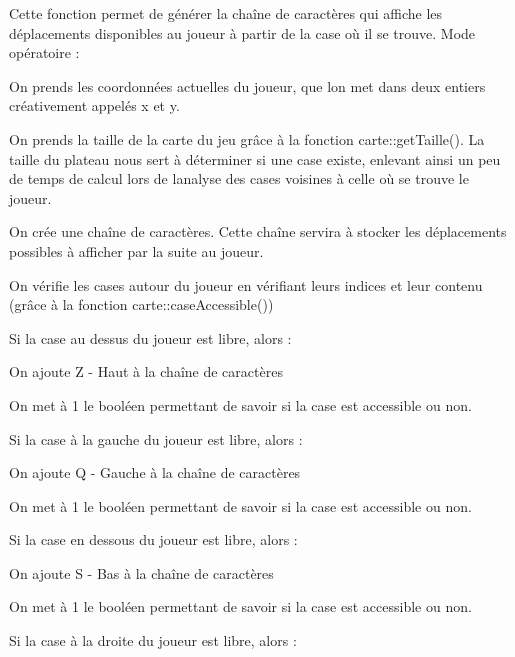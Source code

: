 Cette fonction permet de générer la chaîne de caractères qui affiche les déplacements disponibles au joueur à partir de la case où il se trouve. Mode opératoire \+:
\begin{DoxyItemize}
\item On prends les coordonnées actuelles du joueur, que l\textquotesingle{}on met dans deux entiers créativement appelés {\ttfamily x} et {\ttfamily y}.
\item On prends la taille de la carte du jeu grâce à la fonction {\ttfamily carte\+::get\+Taille()}. La taille du plateau nous sert à déterminer si une case existe, enlevant ainsi un peu de temps de calcul lors de l\textquotesingle{}analyse des cases voisines à celle où se trouve le joueur.
\item On crée une chaîne de caractères. Cette chaîne servira à stocker les déplacements possibles à afficher par la suite au joueur.
\item On vérifie les cases autour du joueur en vérifiant leurs indices et leur contenu (grâce à la fonction {\ttfamily carte\+::case\+Accessible()})
\item Si la case au dessus du joueur est libre, alors \+:
\begin{DoxyItemize}
\item On ajoute {\ttfamily Z -\/ Haut} à la chaîne de caractères
\item On met à 1 le booléen permettant de savoir si la case est accessible ou non.
\end{DoxyItemize}
\item Si la case à la gauche du joueur est libre, alors \+:
\begin{DoxyItemize}
\item On ajoute {\ttfamily Q -\/ Gauche} à la chaîne de caractères
\item On met à 1 le booléen permettant de savoir si la case est accessible ou non.
\end{DoxyItemize}
\item Si la case en dessous du joueur est libre, alors \+:
\begin{DoxyItemize}
\item On ajoute {\ttfamily S -\/ Bas} à la chaîne de caractères
\item On met à 1 le booléen permettant de savoir si la case est accessible ou non.
\end{DoxyItemize}
\item Si la case à la droite du joueur est libre, alors \+:
\begin{DoxyItemize}

\end{DoxyItemize}
\end{DoxyItemize}
